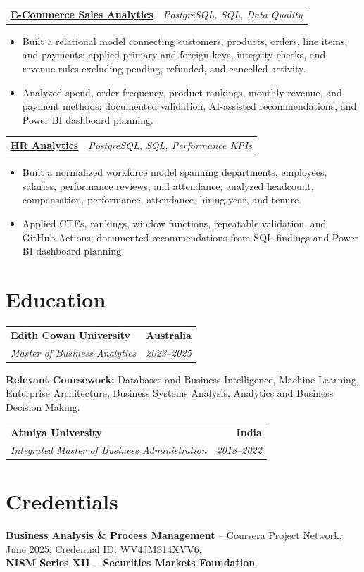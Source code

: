 \documentclass[letterpaper,10pt]{article}
\makeatletter
\newcommand{\role}[4]{%
  \begin{tabularx}{\textwidth}{@{}Xr@{}}
    \textbf{#1} & \textbf{#2} \\
    \textit{#3} & \textit{#4}
  \end{tabularx}\vspace{-1pt}
}
\newcommand{\project}[2]{%
  \begin{tabularx}{\textwidth}{@{}Xr@{}}
    \textbf{#1} & \textit{#2}
  \end{tabularx}\vspace{-1pt}
}
\makeatother
\begin{document}
\project{\href{https://github.com/jainalimehta/Ecommerce-Sales-Analytics}{E-Commerce Sales Analytics}}{PostgreSQL, SQL, Data Quality}
\begin{itemize}
  \item Built a relational model connecting customers, products, orders, line items, and payments; applied primary and foreign keys, integrity checks, and revenue rules excluding pending, refunded, and cancelled activity.
  \item Analyzed spend, order frequency, product rankings, monthly revenue, and payment methods; documented validation, AI-assisted recommendations, and Power BI dashboard planning.
\end{itemize}
\vspace{1pt}

\project{\href{https://github.com/jainalimehta/HR-Analytics}{HR Analytics}}{PostgreSQL, SQL, Performance KPIs}
\begin{itemize}
  \item Built a normalized workforce model spanning departments, employees, salaries, performance reviews, and attendance; analyzed headcount, compensation, performance, attendance, hiring year, and tenure.
  \item Applied CTEs, rankings, window functions, repeatable validation, and GitHub Actions; documented recommendations from SQL findings and Power BI dashboard planning.
\end{itemize}

\section{Education}
\role{Edith Cowan University}{Australia}{Master of Business Analytics}{2023--2025}
\small\textbf{Relevant Coursework:} Databases and Business Intelligence, Machine Learning, Enterprise Architecture, Business Systems Analysis, Analytics and Business Decision Making.\\[2pt]
\role{Atmiya University}{India}{Integrated Master of Business Administration}{2018--2022}

\section{Credentials}
\small\textbf{Business Analysis \& Process Management} -- Coursera Project Network, June 2025; Credential ID: WV4JMS14XVV6.\\[-0.2pt]
\small\textbf{NISM Series XII -- Securities Markets Foundation}
\end{document}
